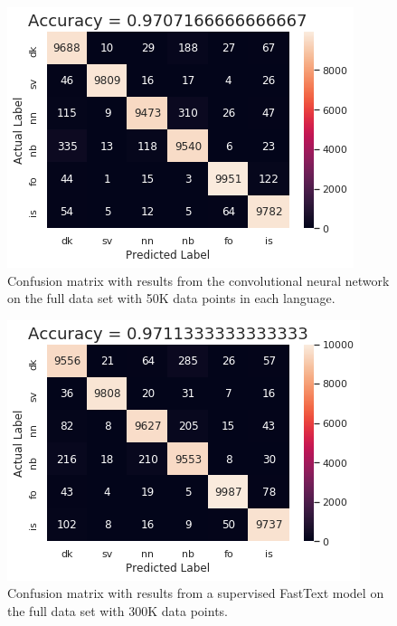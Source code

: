 \begin{figure}
  \centering
  \includegraphics[scale=0.5]{figs/confusion_CNN}
  \caption{Confusion matrix with results from the convolutional neural network on the full data set with 50K data points in each language.}
  \label{confusion_matrix-big-cnn}
\end{figure}

\begin{figure}
  \centering
  \includegraphics[scale=0.5]{figs/fasttext_supervised}
  \caption{Confusion matrix with results from a supervised FastText model on the full data set with 300K data points.}
  \label{fasttext_supervised}
\end{figure}

